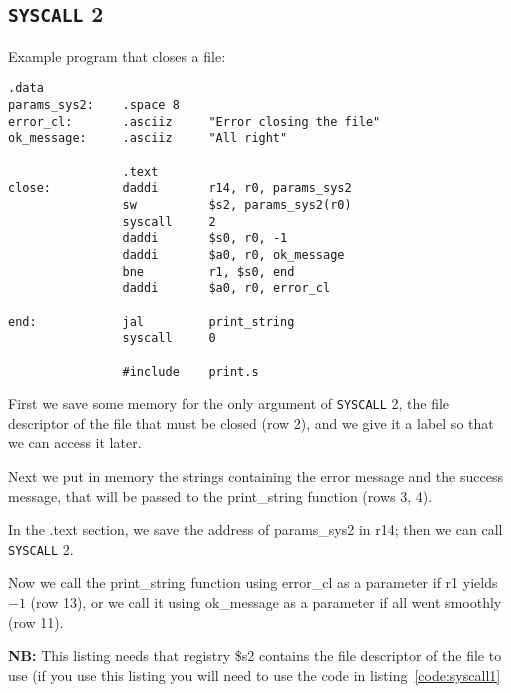 \documentclass[12pt]{report}
\newcommand{\SC}{\texttt{SYSCALL}}
\newcommand{\OF}{\textbf{NB:} This listing needs that registry \$s2 contains the
file descriptor of the file to use (if you use this listing you will need to use
the code in listing~\ref{code:syscall1}}
\begin{document}
\subsection{\SC{} 2}
Example program that closes a file:
\begin{lstlisting}[caption={\SC{} 2 example}, label={code:syscall2}, style={mips}]
                .data
params_sys2:    .space 8
error_cl:       .asciiz     "Error closing the file"
ok_message:     .asciiz     "All right"

                .text
close:          daddi       r14, r0, params_sys2        
                sw          $s2, params_sys2(r0)    
                syscall     2            
                daddi       $s0, r0, -1        
                daddi       $a0, r0, ok_message            
                bne         r1, $s0, end            
                daddi       $a0, r0, error_cl

end:            jal         print_string
                syscall     0
    
                #include    print.s         
\end{lstlisting}
First we save some memory for the only argument of \SC{} 2, the file descriptor
of the file that must be closed (row 2), and we give it a label so that we can
access it later.

Next we put in memory the strings containing the error message and the success
message, that will be passed to the print\_string function (rows 3, 4).

In the .text section, we save the address of params\_sys2 in r14; then we can
call \SC{} 2.

Now we call the print\_string function using error\_cl as a parameter if r1
yields $-1$ (row 13), or we call it using ok\_message as a parameter if all went
smoothly (row 11).

\OF{}
\end{document}

